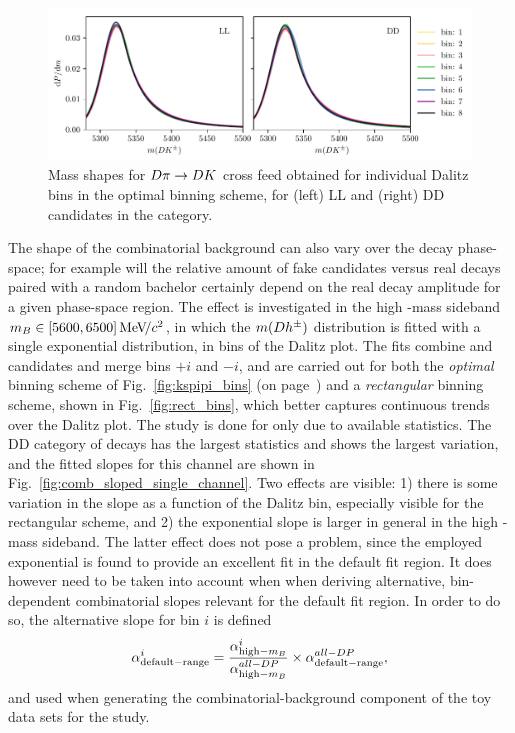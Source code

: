\begin{figure}[tp]
    \centering
    \includegraphics[width=0.85\columnwidth]{figures/analysis/systematics/misID_bin_by_bin.pdf}
    \caption{Mass shapes for ${D}\pi \rightarrow{\ensuremath{D}}{\ensuremath{K}}$ cross feed obtained for individual Dalitz bins in the optimal binning scheme, for (left) LL and (right) DD candidates in the \DtoKspipi category.}
    \label{fig:misID_bin_by_bin}
\end{figure}

The shape of the combinatorial background can also vary over the \D decay phase-space; for example will the relative amount of fake \D candidates versus real \D decays paired with a random bachelor certainly depend on the real \D decay amplitude for a given phase-space region. The effect is investigated in the high \B-mass sideband $m_{B}\in[5600, 6500]\text{\,Me\kern -0.1em V\!/}c^2$, in which the $m({D} h^\pm)$ distribution is fitted with a single exponential distribution, in bins of the Dalitz plot. The fits combine \Bp and \Bm candidates and merge bins $+i$ and $-i$, and are carried out for both the \emph{optimal} binning scheme of Fig.~\ref{fig:kspipi_bins} (on page~\pageref{fig:kspipi_bins}) and a \emph{rectangular} binning scheme, shown in Fig.~\ref{fig:rect_bins}, which better captures continuous trends over the Dalitz plot. The study is done for \DtoKspipi only due to available statistics. The DD category of \BtoDpi decays has the largest statistics and shows the largest variation, and the fitted slopes for this channel are shown in Fig.~\ref{fig:comb_sloped_single_channel}. Two effects are visible: 1) there is some variation in the slope as a function of the Dalitz bin, especially visible for the rectangular scheme, and 2) the exponential slope is larger in general in the high \B-mass sideband. The latter effect does not pose a problem, since the employed exponential is found to provide an excellent fit in the default fit region. It does however need to be taken into account when when deriving alternative, bin-dependent combinatorial slopes relevant for the default fit region. In order to do so, the alternative slope for bin $i$ is defined
\begin{align}
    \alpha^i_\mathrm{default-range} = \frac{\alpha^i_{\mathrm{high-}m_{B}}}{\alpha^{all-DP}_{\mathrm{high-}m_{B}}}\times \alpha^{all-DP}_\mathrm{default-range},
\end{align}
and used when generating the combinatorial-background component of the toy data sets for the study.


